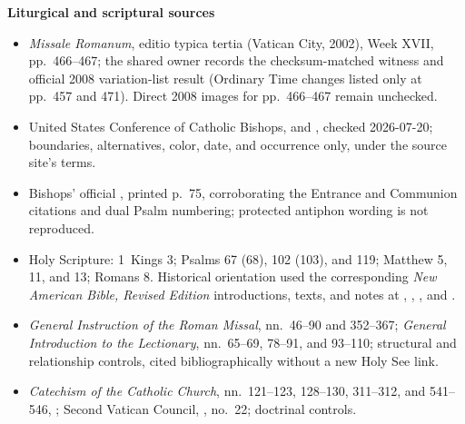 \textbf{Liturgical and scriptural sources}
{\fontsize{7.8}{8.5}\selectfont
\begin{itemize}[itemsep=0em,topsep=0.15em,parsep=0pt]
\item \emph{Missale Romanum}, editio typica tertia (Vatican City, 2002), Week XVII, pp.~466--467; the shared owner records the checksum-matched witness and official 2008 variation-list result (Ordinary Time changes listed only at pp.~457 and 471). Direct 2008 images for pp.~466--467 remain unchecked.
\item United States Conference of Catholic Bishops,  and , checked 2026-07-20; boundaries, alternatives, color, date, and occurrence only, under the source site's terms.
\item Bishops' official , printed p.~75, corroborating the Entrance and Communion citations and dual Psalm numbering; protected antiphon wording is not reproduced.
\item Holy Scripture: 1~Kings 3; Psalms 67 (68), 102 (103), and 119; Matthew 5, 11, and 13; Romans 8. Historical orientation used the corresponding \emph{New American Bible, Revised Edition} introductions, texts, and notes at , , , and .
\item \emph{General Instruction of the Roman Missal}, nn.~46--90 and 352--367; \emph{General Introduction to the Lectionary}, nn.~65--69, 78--91, and 93--110; structural and relationship controls, cited bibliographically without a new Holy See link.
\item \emph{Catechism of the Catholic Church}, nn.~121--123, 128--130, 311--312, and 541--546, ; Second Vatican Council, , no.~22; doctrinal controls.
\end{itemize}}
